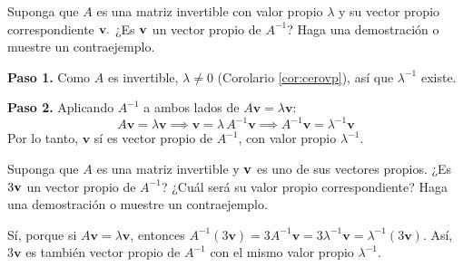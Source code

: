 
\begin{prob} Suponga que $A$ es una matriz invertible con valor propio $\lambda$ y su vector propio correspondiente ${\bf{v}}.$ ¿Es  ${\bf{v}}$ un vector propio de $A^{-1}$? Haga una demostración o muestre un contraejemplo.
\begin{myproof}
\textbf{Paso 1.} Como $A$ es invertible, $\lambda \neq 0$ (Corolario \ref{cor:cerovp}), así que $\lambda^{-1}$ existe.

\textbf{Paso 2.} Aplicando $A^{-1}$ a ambos lados de $A\mathbf{v} = \lambda \mathbf{v}$:
\[
A\mathbf{v} = \lambda \mathbf{v} \implies \mathbf{v} = \lambda\, A^{-1} \mathbf{v} \implies A^{-1} \mathbf{v} = \lambda^{-1} \mathbf{v}
\]
Por lo tanto, $\mathbf{v}$ sí es vector propio de $A^{-1}$, con valor propio $\lambda^{-1}$.
\end{myproof}
\end{prob}

\begin{prob} Suponga que $A$ es una matriz invertible y ${\bf{v}}$ es uno de sus vectores propios.  ¿Es $3{\bf{v}}$ un vector propio de $A^{-1}$? ¿Cuál será su valor propio correspondiente? Haga una demostración o muestre un contraejemplo.
\begin{myproof}
Sí, porque si $A\mathbf{v} = \lambda \mathbf{v}$, entonces $A^{-1}(3\mathbf{v}) = 3A^{-1}\mathbf{v} = 3\lambda^{-1} \mathbf{v} = \lambda^{-1}(3\mathbf{v})$. Así, $3\mathbf{v}$ es también vector propio de $A^{-1}$ con el mismo valor propio $\lambda^{-1}$.
\end{myproof}
\end{prob}


